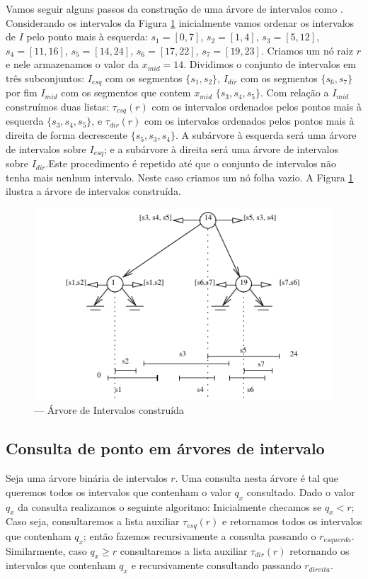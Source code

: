 Vamos seguir alguns passos da construção de uma árvore de intervalos como \cite{cgi1}. Considerando os intervalos da Figura \ref{fig:19} inicialmente vamos ordenar os intervalos de $I$ pelo ponto mais à esquerda: $s_1 = [0, 7]$, $s_2 = [1, 4]$, $s_3 = [5, 12]$, $s_4 = [11,16]$, $s_5 = [14, 24]$, $s_6 = [17, 22]$, $s_7 = [19, 23]$. Criamos um nó raiz $r$ e nele armazenamos o valor da $x_{mid}  = 14$. Dividimos o conjunto de intervalos em três subconjuntos: $I_{esq}$ com os segmentos $\{s_1, s_2\}$, $I_{dir}$ com os segmentos $\{s_6, s_7\}$ por fim $I_{mid}$ com os segmentos que contem $x_{mid}$ $\{ s_3, s_4, s_5\}$. Com relação a $I_{mid}$ construímos duas listas: $\tau_{esq}(r)$ com os intervalos ordenados pelos pontos mais à esquerda $\{s_3,s_4,s_5\}$, e $\tau_{dir}(r)$ com os intervalos ordenados pelos pontos mais à direita de forma decrescente $\{s_5, s_3, s_4\}$. A subárvore à esquerda será uma árvore de intervalos sobre $I_{esq}$; e a subárvore à direita será uma árvore de intervalos sobre $I_{dir}$.Este procedimento é repetido até que o conjunto de intervalos não tenha mais nenhum intervalo. Neste caso criamos um nó folha vazio.
A Figura \ref{fig:19} ilustra a árvore de intervalos construída.

\begin{figure}[h!]
    \begin{center}
        \includegraphics[scale=1.5]{images/interval_tree1.pdf}
    \end{center}
    \caption {— Árvore de Intervalos construída}
    \label{fig:19}
\end{figure}

\subsection{Consulta de ponto em árvores de intervalo}
Seja uma árvore binária de intervalos $r$. Uma consulta nesta árvore é tal que queremos todos os intervalos que contenham o valor $q_x$ consultado.
Dado o valor $q_x$ da consulta realizamos o seguinte algoritmo: Inicialmente checamos se $q_x < r$; Caso seja, consultaremos a lista auxiliar $\tau_{esq}(r)$ e retornamos todos os intervalos que contenham $q_x$; então fazemos recursivamente a consulta passando o $r_{esquerda}$. Similarmente, caso $q_x \geq r $  consultaremos a lista auxiliar $\tau_{dir}(r)$ retornando os intervalos que contenham $q_x$ e recursivamente consultando passando $r_{direita}$.

